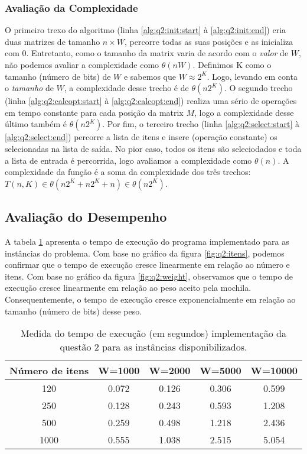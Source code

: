 \documentclass[a4paper]{article}
\newcommand{\algsection}[2]{(linha \ref{alg:#1:#2:start} à \ref{alg:#1:#2:end})}
\begin{document}
\subsubsection{Avaliação da Complexidade}

O primeiro trexo do algoritmo \algsection{q2}{init} cria duas matrizes de tamanho $n \times W$, percorre todas as suas posições e as inicializa com 0. Entretanto, como o tamanho da matrix varia de acordo com o \emph{valor} de $W$, não podemos avaliar a complexidade como $\theta(nW)$. Definimos K como o tamanho (número de bits) de $W$ e sabemos que $W \approx 2^K$. Logo, levando em conta o \emph{tamanho} de $W$, a complexidade desse trecho é de $\theta(n2^K)$. O segundo trecho \algsection{q2}{calcopt} realiza uma sério de operações em tempo constante para cada posição da matrix $M$, logo a complexidade desse último também é $\theta(n2^K)$. Por fim, o terceiro trecho \algsection{q2}{select} percorre a lista de itens e insere (operação constante) os selecionadas na lista de saída. No pior caso, todos os itens são seleciodados e toda a lista de entrada é percorrida, logo avaliamos a complexidade como $\theta(n)$. A complexidade da função é a soma da complexidade dos três trechos: $T(n, K) \in \theta(n2^K + n2^K + n) \in \theta(n2^K)$.

\subsection{Avaliação do Desempenho}

A tabela \ref{tab:q2:bench} apresenta o tempo de execução do programa implementado para as instâncias do problema.
Com base no gráfico da figura \ref{fig:q2:itens}, podemos confirmar que o tempo de execução cresce linearmente em relação ao número e itens. Com base no gráfico da figura \ref{fig:q2:weight}, observamos que o tempo de execução cresce linearmente em relação ao peso aceito pela mochila. Consequentemente, o tempo de execução cresce exponencialmente em relação ao tamanho (número de bits) desse peso.

\begin{table}[H]
\centering
\begin{tabular}{c|c|c|c|c}
Número de itens & W=1000 & W=2000 & W=5000 & W=10000 \\
\hline
120 & 0.072 & 0.126 & 0.306 & 0.599 \\
250 & 0.128 & 0.243 & 0.593 & 1.208 \\
500 & 0.259 & 0.498 & 1.218 & 2.436 \\
1000 & 0.555 & 1.038 & 2.515 & 5.054 \\
\end{tabular}
\caption{Medida do tempo de execução (em segundos) implementação da questão 2 para as instâncias disponibilizados.}
\label{tab:q2:bench}
\end{table}
\end{document}
